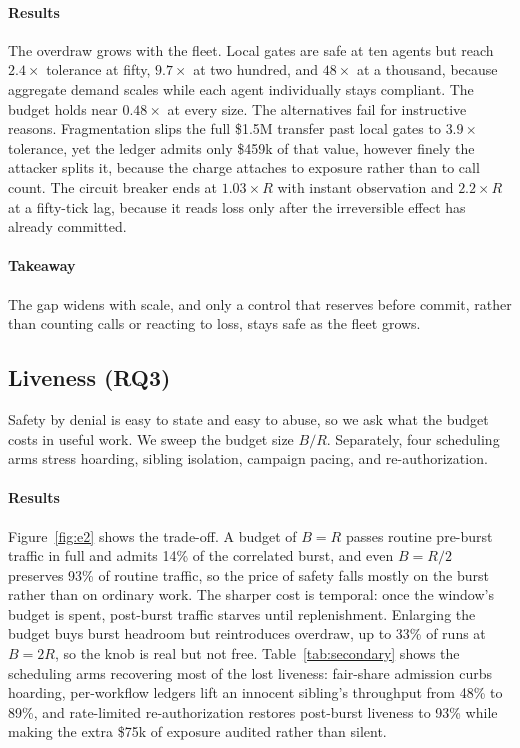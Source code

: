 \documentclass[sigconf]{acmart}
\begin{document}
\paragraph{Results} The overdraw grows with the fleet. Local gates are safe at ten agents but reach $2.4\times$ tolerance at fifty, $9.7\times$ at two hundred, and $48\times$ at a thousand, because aggregate demand scales while each agent individually stays compliant. The budget holds near $0.48\times$ at every size. The alternatives fail for instructive reasons. Fragmentation slips the full \$1.5M transfer past local gates to $3.9\times$ tolerance, yet the ledger admits only \$459k of that value, however finely the attacker splits it, because the charge attaches to exposure rather than to call count. The circuit breaker ends at $1.03\times R$ with instant observation and $2.2\times R$ at a fifty-tick lag, because it reads loss only after the irreversible effect has already committed.

\paragraph{Takeaway} The gap widens with scale, and only a control that reserves before commit, rather than counting calls or reacting to loss, stays safe as the fleet grows.

\subsection{Liveness (RQ3)}
Safety by denial is easy to state and easy to abuse, so we ask what the budget costs in useful work. We sweep the budget size $B/R$. Separately, four scheduling arms stress hoarding, sibling isolation, campaign pacing, and re-authorization.

\paragraph{Results} Figure~\ref{fig:e2} shows the trade-off. A budget of $B=R$ passes routine pre-burst traffic in full and admits 14\% of the correlated burst, and even $B=R/2$ preserves 93\% of routine traffic, so the price of safety falls mostly on the burst rather than on ordinary work. The sharper cost is temporal: once the window's budget is spent, post-burst traffic starves until replenishment. Enlarging the budget buys burst headroom but reintroduces overdraw, up to 33\% of runs at $B=2R$, so the knob is real but not free. Table~\ref{tab:secondary} shows the scheduling arms recovering most of the lost liveness: fair-share admission curbs hoarding, per-workflow ledgers lift an innocent sibling's throughput from 48\% to 89\%, and rate-limited re-authorization restores post-burst liveness to 93\% while making the extra \$75k of exposure audited rather than silent.
\end{document}
